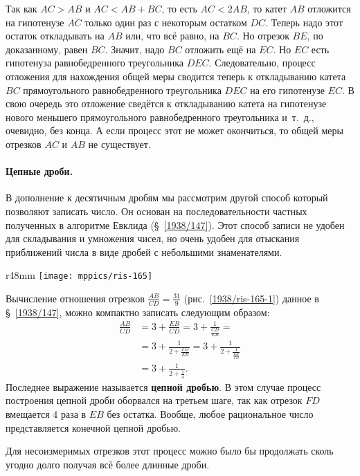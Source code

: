 Так как $AC>AB$ и $AC<AB+BC$, то есть
$AC<2AB$, то катет $AB$ отложится на гипотенузе $AC$ только один раз с некоторым остатком $DC$.
Теперь надо этот остаток откладывать на $AB$ или, что всё равно, на $BC$.
Но отрезок $BE$, по доказанному, равен $BC$.
Значит, надо $BC$ отложить ещё на $EC$.
Но $EC$ есть гипотенуза равнобедренного треугольника $DEC$.
Следовательно, процесс отложения для нахождения общей меры сводится теперь к откладыванию катета $BC$ прямоугольного равнобедренного треугольника $DEC$ на его гипотенузе $EC$.
В свою очередь это отложение сведётся к откладыванию катета на гипотенузе нового меньшего прямоугольного равнобедренного треугольника и~т.~д., очевидно, без конца.
А если процесс этот не может окончиться, то общей меры отрезков $AC$ и $AB$ не существует.

\paragraph{Цепные дроби.}\label{extra/tzepnye-drobi}
В дополнение к десятичным дробям мы рассмотрим другой способ который позволяют записать число.
Он основан на последовательности частных полученных в алгоритме Евклида (§~\ref{1938/147}).
Этот способ записи не удобен для складывания и умножения чисел, но очень удобен для отыскания приближений числа в виде дробей с небольшими знаменателями.

\begin{wrapfigure}[6]{r}{48mm}
\vskip5mm
\centering
\texttt{[image: mppics/ris-165]}
\caption{}\label{1938/ris-165-1}
\end{wrapfigure}

Вычисление отношения отрезков $\frac{AB}{CD}=\frac{31}{9}$ (рис.~\ref{1938/ris-165-1}) данное в §~\ref{1938/147},
можно компактно записать следующим образом:
\begin{align*}
\frac{AB}{CD}&=3+\frac{EB}{CD}=3+\frac{1}{\frac{CD}{EB}}=
\\
&=3+\frac{1}{2+\frac{FD}{EB}}=3+\frac{1}{2+\frac{1}{\frac{EB}{FD}}}
\\
&=3+\frac{1}{2+\frac{1}{4}}.
\end{align*}
Последнее выражение называется \textbf{цепной дробью}.
В этом случае процесс построения цепной дроби оборвался на третьем шаге, так как отрезок $FD$ вмещается 4 раза в $EB$ без остатка.
Вообще, любое рациональное число представляется конечной цепной дробью.

Для несоизмеримых отрезков этот процесс можно было бы продолжать сколь угодно долго получая всё более длинные дроби.

